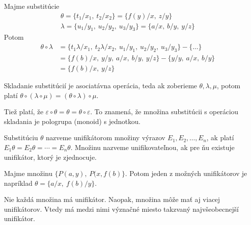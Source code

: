 \begin{priklad}
    Majme substitúcie
    \begin{align*}
        \theta = \{t_1/x_1,\ t_2/x_2\} = \{ f(y)/x,\ z/y\} \\
        \lambda = \{u_1/y_1,\ u_2/y_2,\ u_3/y_3\} = \{ a/x,\ b/y,\ y/z\}
    \end{align*}
    Potom
    \begin{equation*}
    \begin{split}
        \theta \circ \lambda &= 
            \{ t_1 \lambda / x_1,\ t_2\lambda/x_2,\
            u_1/y_1,\ u_2/y_2,\ u_3/y_3\} - \{\dots\} \\ 
        &= \{f(b)/x,\ y/y,\ a/x,\ b/y,\ y/z\} - \{y/y,\ a/x,\ b/y\} \\
        &= \{f(b)/x,\ y/z\}
    \end{split}
    \end{equation*}
\end{priklad}

\begin{poznamka}
    Skladanie substitúcií je asociatávna operácia, teda ak zoberieme 
    $\theta, \lambda, \mu$, potom platí 
    $\theta \circ(\lambda \circ \mu) = (\theta \circ \lambda) \circ \mu$.

    Tiež platí, že $\varepsilon \circ \theta = \theta = 
            \theta \circ \varepsilon$.
    To znamená, že množina substitúcii s operáciou skladania je
    pologrupa (monoid) s jednotkou.
\end{poznamka}

\begin{definicia}[Unifikátor]
    Substitúciu $\theta$ nazveme unifikátorom
    množiny výrazov $E_1, E_2, \dots, E_n$,
    ak platí $E_1\theta = E_2\theta = \cdots = E_n\theta$.
    Množinu nazveme unifikovateľnou, ak pre ňu existuje
    unifikátor, ktorý je zjednocuje.
\end{definicia}

\begin{priklad}
    Majme množinu $\{P(a,y),\ P(x,f(b)\}$.
    Potom jeden z možných unifikátorov je napríklad
    $\theta = \{a/x,\ f(b)/y\}$.
\end{priklad}

\begin{poznamka}
    Nie každá množina má unifikátor. Naopak, množina môže mať aj
    viacej unifikátorov. Vtedy má medzi nimi význačné miesto takzvaný
    najvšeobecnejší unifikátor.
\end{poznamka}

